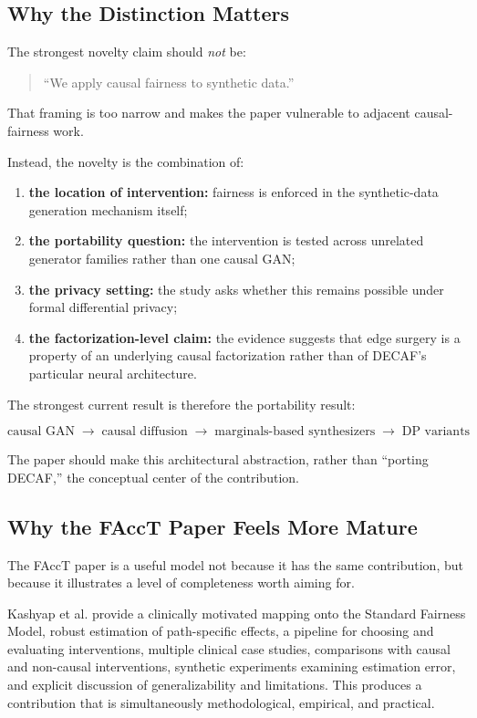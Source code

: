 \documentclass[11pt]{article}
\begin{document}
\subsection{Why the Distinction Matters}

The strongest novelty claim should \emph{not} be:

\begin{quote}
``We apply causal fairness to synthetic data.''
\end{quote}

That framing is too narrow and makes the paper vulnerable to adjacent causal-fairness work.

Instead, the novelty is the combination of:

\begin{enumerate}
    \item \textbf{the location of intervention:} fairness is enforced in the synthetic-data generation mechanism itself;
    \item \textbf{the portability question:} the intervention is tested across unrelated generator families rather than one causal GAN;
    \item \textbf{the privacy setting:} the study asks whether this remains possible under formal differential privacy;
    \item \textbf{the factorization-level claim:} the evidence suggests that edge surgery is a property of an underlying causal factorization rather than of DECAF's particular neural architecture.
\end{enumerate}

The strongest current result is therefore the portability result:

\[
\boxed{
\text{causal GAN}
\;\rightarrow\;
\text{causal diffusion}
\;\rightarrow\;
\text{marginals-based synthesizers}
\;\rightarrow\;
\text{DP variants}
}
\]

The paper should make this architectural abstraction, rather than ``porting DECAF,'' the conceptual center of the contribution.

\subsection{Why the FAccT Paper Feels More Mature}

The FAccT paper is a useful model not because it has the same contribution, but because it illustrates a level of completeness worth aiming for.

Kashyap et al. provide a clinically motivated mapping onto the Standard Fairness Model, robust estimation of path-specific effects, a pipeline for choosing and evaluating interventions, multiple clinical case studies, comparisons with causal and non-causal interventions, synthetic experiments examining estimation error, and explicit discussion of generalizability and limitations. This produces a contribution that is simultaneously methodological, empirical, and practical.
\end{document}
